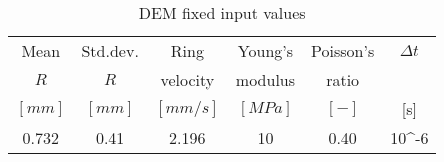 \begin{table}[h]
\centering
\begin{tabular}{cccccc}
\hline
    Mean & Std.dev. & Ring  & Young's & Poisson's & $\Delta t$\\
    $R$ & $R$ & velocity & modulus & ratio & \\
    $[mm]$  & $[mm]$  & $[mm/s]$ & $[MPa]$ & $[-]$ & [s]\\
    \hline
    0.732 & 0.41  & 2.196 & 10    & 0.40 & 10^{-6}\\


\hline
\end{tabular}
\caption{DEM fixed input values}
\label{tab:09DEMFixedinputvalues}
\end{table}